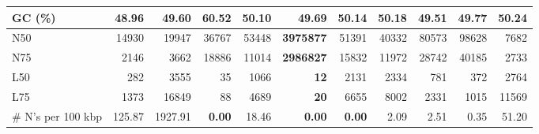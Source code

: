 \documentclass[12pt,a4paper]{article}
\begin{document}
\begin{table}[ht]
\begin{center}
\begin{tabular}{|l*{10}{|r}|}
GC (\%) & 48.96 & 49.60 & 60.52 & 50.10 & 49.69 & 50.14 & 50.18 & 49.51 & 49.77 & 50.24 \\ \hline
N50 & 14930 & 19947 & 36767 & 53448 & {\bf 3975877} & 51391 & 40332 & 80573 & 98628 & 7682 \\ \hline
N75 & 2146 & 3662 & 18886 & 11014 & {\bf 2986827} & 15832 & 11972 & 28742 & 40185 & 2733 \\ \hline
L50 & 282 & 3555 & 35 & 1066 & {\bf 12} & 2131 & 2334 & 781 & 372 & 2764 \\ \hline
L75 & 1373 & 16849 & 88 & 4689 & {\bf 20} & 6655 & 8002 & 2331 & 1015 & 11569 \\ \hline
\# N's per 100 kbp & 125.87 & 1927.91 & {\bf 0.00} & 18.46 & {\bf 0.00} & {\bf 0.00} & 2.09 & 2.51 & 0.35 & 51.20 \\ \hline
\end{tabular}
\end{center}
\end{table}
\end{document}
